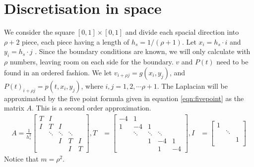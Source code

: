 \section{Discretisation in space} \label{sec:space}
We consider the square $[0,1] \times [0,1]$ and divide each spacial direction into $\rho+2$ piece, each piece having a length of $h_s = 1/(\rho+1)$. Let $x_i = h_s \cdot i$ and $y_i = h_s \cdot j$ . Since the boundary conditions are known, we will only calculate with $\rho$ numbers, leaving room on each side for the boundary. $v$ and $P(t)$ need to be found in an ordered fashion. We let  $v_{i+\rho j} = g(x_i, y_j)$, and 
$P(t)_{i+\rho j} = p(t,x_i, y_j)$, where $i,j = 1,2,\cdots \rho+1$.
The Laplacian will be approximated by the five point formula given in equation \eqref{eqn:fivepoint} as the matrix $A$. This is a second order approximation.
\begin{equation} \label{eqn:fivepoint} 
\begin{aligned} 
A = \frac{1}{h_s^2} 
\begin{bmatrix}
T & I & & &\\
I& T & I & &\\
& \ddots & \ddots & \ddots & \\
& & I& T & I\\
& & & I & T
\end{bmatrix}
, T  &= 
\begin{bmatrix}
-4 & 1 & & &\\
1 & -4 & 1 & &  \\
& \ddots & \ddots & \ddots & \\
&  & 1 & -4 & 1 \\
 & & & 1 & -4
\end{bmatrix},
I &= 
\begin{bmatrix}
1 & &\\
& \ddots & \\
& & 1 \\
\end{bmatrix}
\end{aligned}
\end{equation}
Notice that $m = \rho ^2$.

